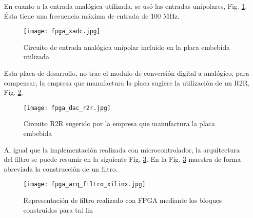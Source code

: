 \documentclass[informe.tex]{subfiles}
\begin{document}
En cuanto a la entrada analógica utilizada, se usó las entradas unipolares, Fig. \ref{fig:disenio_y_construccion:fpga:board:xadc}. Ésta tiene una frecuencia máxima de entrada de 100 MHz.\newline

\begin{figure}[h]
	\centering
	\texttt{[image: fpga\_xadc.jpg]}	
	\caption{Circuito de entrada analógica unipolar incluido en la placa embebida utilizada}
	\label{fig:disenio_y_construccion:fpga:board:xadc}
	\end{figure}

Esta placa de desarrollo, no trae el modulo de conversión digital a analógico, para compensar, la empresa que manufactura la placa sugiere la utilización de un R2R, Fig. \ref{fig:disenio_y_construccion:fpga:board:r2r}.\\

\begin{figure}[h]
	\centering
	\texttt{[image: fpga\_dac\_r2r.jpg]}	
	\caption{Circuito R2R sugerido por la empresa que manufactura la placa embebida}
	\label{fig:disenio_y_construccion:fpga:board:r2r}
	\end{figure}
	
Al igual que la implementación realizada con microcontrolador, la arquitectura del filtro se puede resumir en la siguiente Fig. \ref{fig:disenio_y_construccion:fpga:board:arq}. En la Fig. \ref{fig:disenio_y_construccion:fpga:board:arq} muestra de forma abreviada la construcción de un filtro. 

\begin{figure}[h]
	\centering
	\texttt{[image: fpga\_arq\_filtro\_xilinx.jpg]}	
	\caption{Representación de filtro realizado con FPGA mediante los bloques construidos para tal fin}
	\label{fig:disenio_y_construccion:fpga:board:arq}
	\end{figure}
\end{document}
